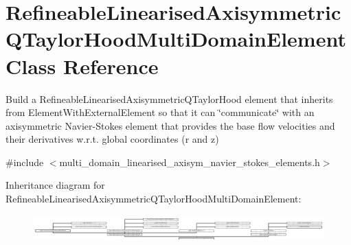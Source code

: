 \hypertarget{classRefineableLinearisedAxisymmetricQTaylorHoodMultiDomainElement}{}\section{Refineable\+Linearised\+Axisymmetric\+Q\+Taylor\+Hood\+Multi\+Domain\+Element Class Reference}
\label{classRefineableLinearisedAxisymmetricQTaylorHoodMultiDomainElement}


Build a Refineable\+Linearised\+Axisymmetric\+Q\+Taylor\+Hood element that inherits from Element\+With\+External\+Element so that it can \char`\"{}communicate\char`\"{} with an axisymmetric Navier-\/\+Stokes element that provides the base flow velocities and their derivatives w.\+r.\+t. global coordinates (r and z)  




{\ttfamily \#include $<$multi\+\_\+domain\+\_\+linearised\+\_\+axisym\+\_\+navier\+\_\+stokes\+\_\+elements.\+h$>$}

Inheritance diagram for Refineable\+Linearised\+Axisymmetric\+Q\+Taylor\+Hood\+Multi\+Domain\+Element\+:\begin{figure}[H]
\begin{center}
\leavevmode
\includegraphics[height=1.044776cm]{classRefineableLinearisedAxisymmetricQTaylorHoodMultiDomainElement}
\end{center}
\end{figure}

